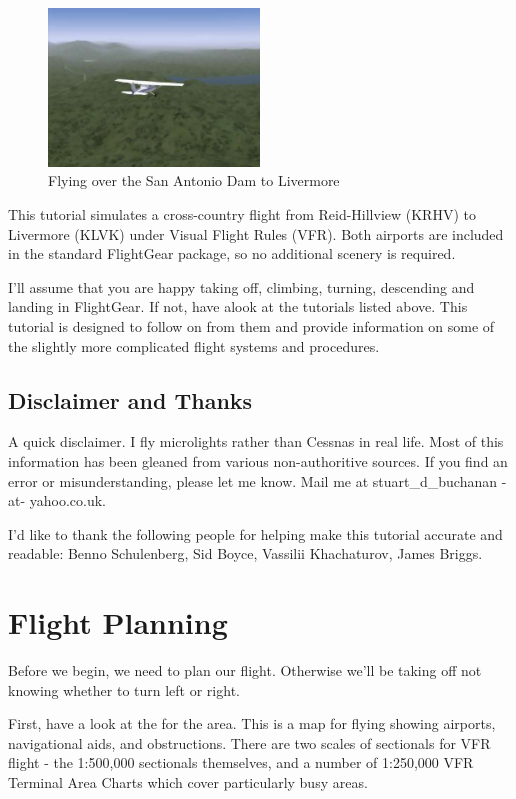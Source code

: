 \begin{figure}[!htp]
\centering
\includegraphics[width=0.5\textwidth]{antonio2}
\caption{Flying over the San Antonio Dam to Livermore}
\end{figure}

This tutorial simulates a cross-country flight from Reid-Hillview (KRHV) to
Livermore (KLVK) under Visual Flight Rules (VFR). Both airports are
included in the standard FlightGear package, so no additional scenery is required.

I'll assume that you are happy taking off, climbing, turning, descending
and landing in FlightGear. If not, have alook at the tutorials listed above.
This tutorial is designed to follow on from them and provide information on
some of the slightly more complicated flight systems and procedures.

\subsection{Disclaimer and Thanks}

A quick disclaimer. I fly microlights rather than Cessnas in real life. Most of
this information has been gleaned from various non-authoritive sources. If you
find an error or misunderstanding, please let me know. Mail me at
stuart\_d\_buchanan -at- yahoo.co.uk.

I'd like to thank the following people for helping make this tutorial accurate
and readable: Benno Schulenberg, Sid Boyce, Vassilii Khachaturov, James Briggs.

\section{Flight Planning}

Before we begin, we need to plan our flight.
Otherwise we'll be taking off not knowing whether to turn left or right.

First, have a look at the  for the area. This is a map for
flying showing airports, navigational aids, and obstructions.
There are two scales of sectionals for VFR flight -
the 1:500,000 sectionals themselves, and a number of
1:250,000 VFR Terminal Area Charts which cover particularly busy areas.

